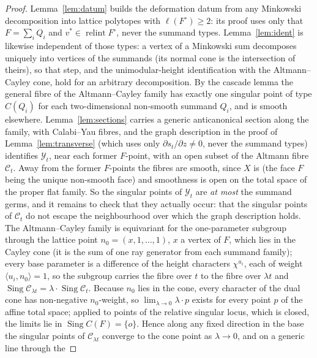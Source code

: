 \documentclass[11pt]{amsart}
\theoremstyle{definition}
\theoremstyle{remark}
\begin{document}
\begin{proof}
Lemma~\ref{lem:datum} builds the deformation datum from any Minkowski decomposition
into lattice polytopes with $\ell(F^\circ) \ge 2$: its proof uses only that
$F = \sum_i Q_i$ and $v^\ast \in \operatorname{relint} F^\circ$, never the summand
types.  Lemma~\ref{lem:ident} is likewise independent of those types: a
vertex of a Minkowski sum
decomposes uniquely into vertices of the summands (its normal cone is the
intersection of theirs), so that step, and the unimodular-height identification
with the Altmann--Cayley cone, hold for an arbitrary decomposition.  By the cascade
lemma \cite[Lemma~2.4]{paper1} the general fibre of the Altmann--Cayley family has
exactly one singular point of type $C(Q_i)$ for each two-dimensional non-smooth
summand $Q_i$, and is smooth elsewhere.  Lemma~\ref{lem:sections} carries a generic
anticanonical section along the family, with Calabi--Yau fibres, and the
graph description in the proof of Lemma~\ref{lem:transverse} (which
uses only $\partial s_t/\partial z \neq 0$, never the summand types)
identifies $\mathcal Y_t$, near each former $F$-point, with an open
subset of the Altmann fibre $\mathcal C_t$.  Away from the former
$F$-points the fibres are smooth, since $X$ is (the face $F$ being the
unique non-smooth face) and smoothness is open on the total space of the
proper flat family.  So the singular points of $\mathcal Y_t$ are
\emph{at most} the summand germs, and it remains to check that they
actually occur: that the singular points of $\mathcal C_t$ do not
escape the neighbourhood over which the graph description holds.  The
Altmann--Cayley family is equivariant for the one-parameter subgroup
through the lattice point $n_0 = (x, 1, \dots, 1)$, $x$ a vertex of $F$,
which lies in the Cayley cone (it is the sum of one ray generator from
each summand family); every base parameter is a difference
of the height characters $\chi^{u_i}$, each of weight
$\langle u_i, n_0\rangle = 1$, so the subgroup carries the fibre over
$t$ to the fibre over $\lambda t$ and
$\operatorname{Sing} \mathcal C_{\lambda t}
= \lambda \cdot \operatorname{Sing} \mathcal C_t$.  Because $n_0$ lies
in the cone, every character of the dual cone has non-negative
$n_0$-weight, so $\lim_{\lambda\to 0}\lambda \cdot p$ exists for every
point $p$ of the affine total space; applied to points of the relative
singular locus, which is closed, the limits lie in
$\operatorname{Sing} C(F) = \{o\}$.  Hence along any fixed direction in
the base the singular points of $\mathcal C_{\lambda t}$ converge to
the cone point as $\lambda \to 0$, and on a generic line through the

\end{proof}
\end{document}
